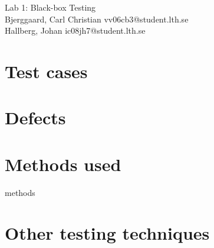 \documentclass[titlepage]{article}
\begin{document}
\begin{center}
	\huge{Lab 1: Black-box Testing } \\
	\small{Bjerggaard, Carl Christian vv06cb3@student.lth.se \\Hallberg, Johan ic08jh7@student.lth.se}

\vspace*{1cm}

\end{center}

\thispagestyle{empty}

\clearpage
\section{Test cases}











  
\section{Defects}


\section{Methods used}
 {methods}

\section{Other testing techniques}
\end{document}
